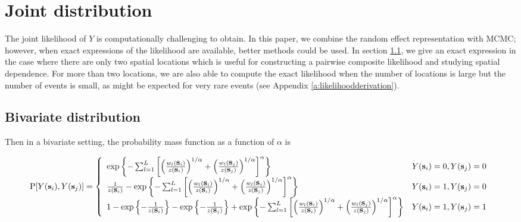 \documentclass[11pt]{article}
\begin{document}
\section{Joint distribution}\label{s:multivariate}
The joint likelihood of $Y$ is computationally challenging to obtain.
In this paper, we combine the random effect representation with MCMC; however, when exact expressions of the likelihood are available, better methods could be used.
In section \ref{s:bivariate}, we give an exact expression in the case where there are only two spatial locations which is useful for constructing a pairwise composite likelihood and studying spatial dependence.
For more than two locations, we are also able to compute the exact likelihood when the number of locations is large but the number of events is small, as might be expected for very rare events (see Appendix \ref{a:likelihoodderivation}).

\subsection{Bivariate distribution}\label{s:bivariate}
Then in a bivariate setting, the probability mass function as a function of $\alpha$ is
\begin{adjustwidth}{-0.25in}{}
{\footnotesize
\begin{align} \label{biv}
  \text{P}[Y(\mbox{\bf s}_i), Y(\mbox{\bf s}_j)] = \left\{ \begin{array}{ll}
    \exp \left\{ - \sum_{ l = 1 }^{ L } \left[ \left( \frac{ w_{ l }(\mbox{\bf s}_i) }{ z(\mbox{\bf s}_i) } \right)^{1/\alpha} + \left( \frac{ w_{l }(\mbox{\bf s}_j)}{z(\mbox{\bf s}_j)} \right)^{1/\alpha} \right]^{\alpha} \right\} &Y(\mbox{\bf s}_i) = 0, Y(\mbox{\bf s}_j) = 0\\
    \frac{ 1 }{z(\mbox{\bf s}_i)} - \exp \left\{ - \sum_{ l = 1 }^{ L } \left[ \left( \frac{ w_{ l }(\mbox{\bf s}_i) }{ z(\mbox{\bf s}_i) } \right)^{1/\alpha} + \left( \frac{ w_{l }(\mbox{\bf s}_j)}{z(\mbox{\bf s}_j)} \right)^{1/\alpha} \right]^{\alpha} \right\} &Y(\mbox{\bf s}_i) = 1, Y(\mbox{\bf s}_j) = 0 \\
    1 - \exp\left\{ - \frac{ 1 }{ z(\mbox{\bf s}_i) } \right\} - \exp \left\{ - \frac{ 1 }{z(\mbox{\bf s}_j)} \right\} + \exp \left\{ - \sum_{ l = 1 }^{ L } \left[ \left( \frac{ w_{ l }(\mbox{\bf s}_i) }{ z(\mbox{\bf s}_i) } \right)^{1/\alpha} + \left( \frac{ w_{l }(\mbox{\bf s}_j)}{z(\mbox{\bf s}_j)} \right)^{1/\alpha} \right]^{\alpha} \right\} &Y(\mbox{\bf s}_i) = 1, Y(\mbox{\bf s}_j) = 1
  \end{array} \right.
\end{align}
}
\end{adjustwidth}
\end{document}
